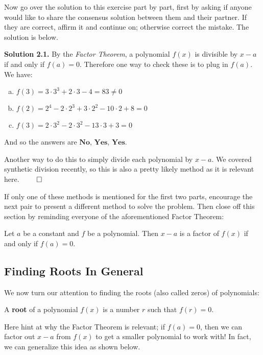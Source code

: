 Now go over the solution to this exercise part by part, first by asking if anyone would like to share the consensus solution between them and their partner. If they are correct, affirm it and continue on; otherwise correct the mistake. The solution is below.

\textbf{Solution 2.1.} By the \emph{Factor Theorem}, a polynomial $f(x)$ is divisible by $x-a$ if and only if $f(a) = 0$. Therefore one way to check these is to plug in $f(a)$. We have:
\begin{enumerate}[(a)]
    \item $f(3) = 3\cdot 3^3 + 2\cdot 3 - 4 = 83 \neq 0$
    \item $f(2) = 2^4 - 2\cdot 2^3 + 3\cdot 2^2 - 10\cdot 2 + 8 = 0$
    \item $f(3) = 2\cdot 3^2 - 2\cdot 3^2 - 13\cdot 3 + 3 = 0$
\end{enumerate} And so the answers are $\boxed{\textbf{No, Yes, Yes}}$.

Another way to do this to simply divide each polynomial by $x-a$. We covered synthetic division recently, so this is also a pretty likely method as it is relevant here. \hspace*{\fill} $\qed$

If only one of these methods is mentioned for the first two parts, encourage the next pair to present a different method to solve the problem. Then close off this section by reminding everyone of the aforementioned Factor Theorem:

\begin{theorem}
    Let $a$ be a constant and $f$ be a polynomial. Then $x-a$ is a factor of $f(x)$ if and only if $f(a) = 0$.
\end{theorem}



\subsection{Finding Roots In General}

We now turn our attention to finding the roots (also called zeros) of polynomials:

\begin{definition}
    A \textbf{root} of a polynomial $f(x)$ is a number $r$ such that $f(r) = 0$.
\end{definition}

Here hint at why the Factor Theorem is relevant; if $f(a) = 0$, then we can factor out $x-a$ from $f(x)$ to get a smaller polynomial to work with! In fact, we can generalize this idea as shown below. 

